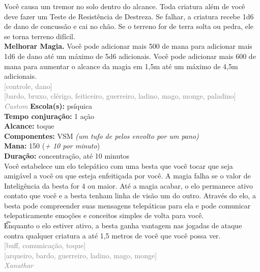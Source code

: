 \documentclass{RPG_Adventure}[2021/10/20]
\begin{document}
{\normalsize Você causa um tremor no solo dentro do alcance. Toda criatura além de você deve fazer um Teste de Resistência de Destreza. Se falhar, a criatura recebe 1d6 de dano de concussão e cai no chão. Se o terreno for de terra solta ou pedra, ele se torna terreno difícil.\\\t \textbf{Melhorar Magia.} Você pode adicionar mais 500 de mana para adicionar mais 1d6 de dano até um máximo de 5d6 adicionais. Você pode adicionar mais 600 de mana para aumentar o alcance da magia em 1,5m até um máximo de 4,5m adicionais.\\}
{\scriptsize \textcolor{gray}{[controle, dano]\\}}
{\scriptsize \textcolor{gray}{[bardo, bruxo, clérigo, feiticeiro, guerreiro, ladino, mago, monge, paladino]\\}}
{\tiny \textcolor{gray}{\textit{Custom}}}\jump{}
{\small \t \textbf{Escola(s):} psíquica\\\t \textbf{Tempo conjuração:} 1 ação\\\t \textbf{Alcance:} toque\\\t \textbf{Componentes:} VSM \textit{(um tufo de pelos envolto por um pano)}\\\t \textbf{Mana:} 150 (\textit{+ 10 por minuto})\\\t \textbf{Duração:} concentração, até 10 minutos\\}
{\normalsize Você estabelece um elo telepático com uma besta que você tocar que seja amigável a você ou que esteja enfeitiçada por você. A magia falha se o valor de Inteligência da besta for 4 ou maior. Até a magia acabar, o elo permanece ativo contato que você e a besta tenham linha de visão um do outro. Através do elo, a besta pode compreender suas mensagens telepáticas para ela e pode comunicar telepaticamente emoções e conceitos simples de volta para você.\\\t Enquanto o elo estiver ativo, a besta ganha vantagem nas jogadas de ataque contra qualquer criatura a até 1,5 metros de você que você possa ver.\\}
{\scriptsize \textcolor{gray}{[buff, comunicação, toque]\\}}
{\scriptsize \textcolor{gray}{[arqueiro, bardo, guerreiro, ladino, mago, monge]\\}}
{\tiny \textcolor{gray}{\textit{Xanathar}}}\jump{}
\end{document}
